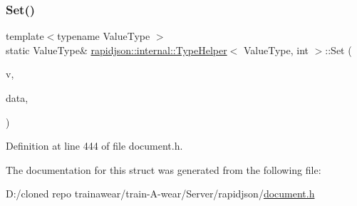 \subsubsection{\texorpdfstring{Set()}{Set()}\hspace{0.1cm}{\footnotesize\ttfamily [2/2]}}
{\footnotesize\ttfamily template$<$typename Value\+Type $>$ \\
static Value\+Type\& \mbox{\hyperlink{structrapidjson_1_1internal_1_1_type_helper}{rapidjson\+::internal\+::\+Type\+Helper}}$<$ Value\+Type, int $>$\+::Set (\begin{DoxyParamCaption}\item[{Value\+Type \&}]{v,  }\item[{int}]{data,  }\item[{typename Value\+Type\+::\+Allocator\+Type \&}]{ }\end{DoxyParamCaption})\hspace{0.3cm}{\ttfamily [static]}}



Definition at line 444 of file document.\+h.


\begin{DoxyCode}{0}

\end{DoxyCode}


The documentation for this struct was generated from the following file\+:\begin{DoxyCompactItemize}
\item 
D\+:/cloned repo trainawear/train-\/\+A-\/wear/\+Server/rapidjson/\mbox{\hyperlink{document_8h}{document.\+h}}\end{DoxyCompactItemize}
